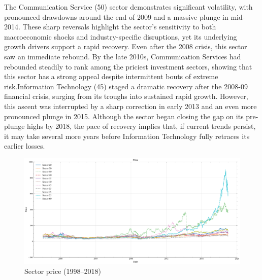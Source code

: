 The Communication Service (50) sector demonstrates significant volatility, with pronounced drawdowns around the end of 2009 and a massive plunge in mid-2014. These sharp reversals highlight the sector's sensitivity to both macroeconomic shocks and industry-specific disruptions, yet its underlying growth drivers support a rapid recovery. Even after the 2008 crisis, this sector saw an immediate rebound. By the late 2010s, Communication Services had rebounded steadily to rank among the priciest investment sectors, showing that this sector has a strong appeal despite intermittent bouts of extreme risk.Information Technology (45) staged a dramatic recovery after the 2008-09 financial crisis, surging from its troughs into sustained rapid growth. However, this ascent was interrupted by a sharp correction in early 2013 and an even more pronounced plunge in 2015. Although the sector began closing the gap on its pre-plunge highs by 2018, the pace of recovery implies that, if current trends persist, it may take several more years before Information Technology fully retraces its earlier losses.


\begin{figure}[H]
     \centering
     \includegraphics[width=\textwidth]{plots/data/sector_price.png}
     \caption{Sector price (1998--2018)}\label{fig:sector_price}
 \end{figure}


 





